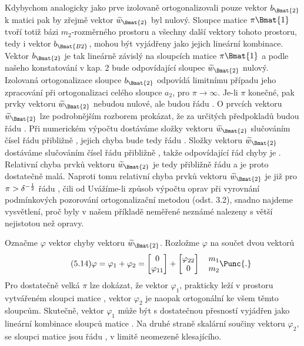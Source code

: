 %
Kdybychom analogicky jako prve izolovaně ortogonalizovali pouze
vektor $b_{\Bmat{2}}$ k matici  pak by zřejmě vektor
$\widetilde w_{\Bmat{2}}$ byl nulový.
%
Sloupce matice $\pi\Bmat{1}$ tvoří totiž bázi $m_2$-rozměrného
prostoru a všechny další vektory tohoto prostoru, tedy i vektor
$b_{\Bmat{B2}}$, mohou být vyjádřeny jako jejich lineární kombinace.
%
Vektor $b_{\Bmat{2}}$ je tak lineárně závislý na sloupcích matice
$\pi\Bmat{1}$ a podle našeho konstatování v kap. 2 bude odpovídající
sloupec $\widetilde w_{\Bmat{2}}$ nulový.
%
Izolovaná ortogonalizace sloupce $b_{\Bmat{2}}$ odpovídá limitnímu
případu jeho zpracování při ortogonalizaci celého sloupce $a_2$,
pro $\pi \rightarrow \infty$.
%
Je-li $\pi$ konečné, pak prvky vektoru  $\widetilde w_{\Bmat{2}}$
nebudou nulové, ale budou řádu \Ocal{\pi}.
O prvcích vektoru $\widetilde w_{\Bmat{2}}$ lze podrobnějším
rozborem prokázat, že za určitých předpokladů budou řádu .
Při numerickém výpočtu dostáváme složky vektoru
$\widetilde w_{\Bmat{2}}$ slučováním čísel
řádu přibližně , jejich chyba bude tedy řádu
\Ocal{\delta}.
%
Složky vektoru $\widetilde w_{\Bmat{2}}$ dostáváme slučováním čísel
řádu přibližně \Ocal{\pi}, takže odpovídající řád chyby je
\Ocal{\pi\delta}.
%
Relativní chyba prvků vektoru $\widetilde w_{\Bmat{2}}$
je tedy přibližně řádu \Ocal{\pi\delta} a je proto
dostatečně malá.
%
Naproti tomu relativní chyba prvků vektoru $\widetilde w_{\Bmat{2}}$
je již pro $\pi > \delta^{-{1\over2}}$ řádu , čili
od
%
%
Uvážíme-li způsob výpočtu oprav při vyrovnání podmínkových pozorování
ortogonalizační metodou (odst. 3.2), snadno najdeme vysvětlení, proč
byly v našem příkladě neměřené neznámé nalezeny s větší nejistotou než
opravy.


Označme $\varphi$ vektor chyby vektoru $\widetilde w_{\Bmat{2}}$.
Rozložme $\varphi$ na součet dvou vektorů
%
\begin{align*}
\tag{5.14}
\varphi = \varphi_1 + \varphi_2 =
\begin{bmatrix} 0 \\ \varphi_{11} \end{bmatrix} +
\begin{bmatrix} \varphi_{22} \\ 0 \end{bmatrix}
\quad\begin{matrix} m_1 \\ m_2 \end{matrix} \Punc{.}
\end{align*}
%
%
Pro dostatečně velká $\pi$ lze dokázat, že vektor $\varphi_1$,
prakticky leží v prostoru vytvářeném sloupci matice , vektor
$\varphi_2$ je naopak ortogonální ke všem těmto sloupcům. Skutečně,
vektor $\varphi_1$ může být s dostatečnou přesností vyjádřen jako
lineární kombinace sloupců matice . Na druhé straně skalární
součiny vektoru $\varphi_2$, se sloupci matice  jsou řádu
, v limitě neomezeně klesajícího.


